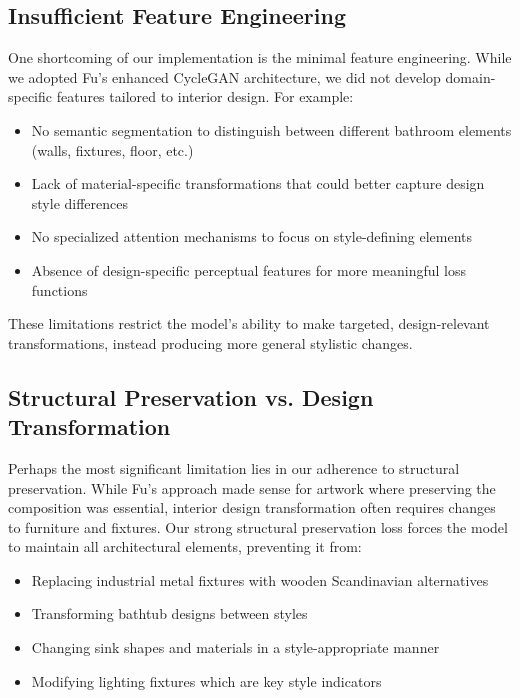 \documentclass[twocolumn,superscriptaddress,aps]{revtex4-1}
\begin{document}
\subsection{Insufficient Feature Engineering}

One shortcoming of our implementation is the minimal feature engineering. While we adopted Fu's enhanced CycleGAN architecture, we did not develop domain-specific features tailored to interior design. For example:

\begin{itemize}
    \item No semantic segmentation to distinguish between different bathroom elements (walls, fixtures, floor, etc.)
    \item Lack of material-specific transformations that could better capture design style differences
    \item No specialized attention mechanisms to focus on style-defining elements
    \item Absence of design-specific perceptual features for more meaningful loss functions
\end{itemize}

These limitations restrict the model's ability to make targeted, design-relevant transformations, instead producing more general stylistic changes.

\subsection{Structural Preservation vs. Design Transformation}

Perhaps the most significant limitation lies in our adherence to structural preservation. While Fu's approach made sense for artwork where preserving the composition was essential, interior design transformation often requires changes to furniture and fixtures. Our strong structural preservation loss forces the model to maintain all architectural elements, preventing it from:

\begin{itemize}
    \item Replacing industrial metal fixtures with wooden Scandinavian alternatives
    \item Transforming bathtub designs between styles
    \item Changing sink shapes and materials in a style-appropriate manner
    \item Modifying lighting fixtures which are key style indicators
\end{itemize}
\end{document}
